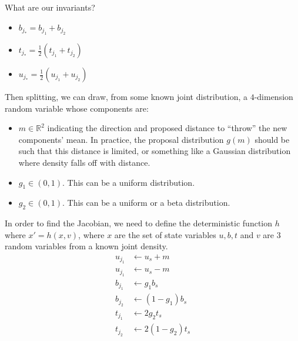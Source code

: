 \documentclass[11pt]{article}
\begin{document}
What are our invariants?
\begin{itemize}
\item $b_{j_{*}}=b_{j_{1}}+b_{j_{2}}$
\item $t_{j_{*}} = \frac{1}{2}(t_{j_1} + t_{j_2})$
\item $u_{j_{*}} = \frac{1}{2}(u_{j_1} + u_{j_2})$
\end{itemize}
Then splitting, we can draw, from some known joint distribution, a
$4$-dimension random variable whose components
are: 
\begin{itemize}
\item $m\in\mathbb{R}^{2}$ indicating the direction and proposed distance
to {}``throw'' the new components' mean. In practice, the proposal
distribution $g\left(m\right)$ should be such that this distance
is limited, or something like a Gaussian distribution where density
falls off with distance.
\item $g_1 \in (0, 1)$. This can be a uniform distribution.
\item $g_2 \in (0, 1)$. This can be a uniform or a beta distribution.
\end{itemize}
In order to find the Jacobian, we need to define the deterministic
function $h$ where $x'=h\left(x,v\right)$, where $x$ are the set
of state variables $u,b, t$ and $v$ are $3$ random variables
from a known joint density.
\begin{align*}
u_{j_1} & \leftarrow u_s + m \\
u_{j_1} & \leftarrow u_s - m \\
b_{j_1} & \leftarrow g_1 b_s\\
b_{j_2} & \leftarrow (1 - g_1) b_s \\
t_{j_1} & \leftarrow 2 g_2 t_s \\
t_{j_2} & \leftarrow 2 (1 - g_2) t_s
\end{align*}
\end{document}
